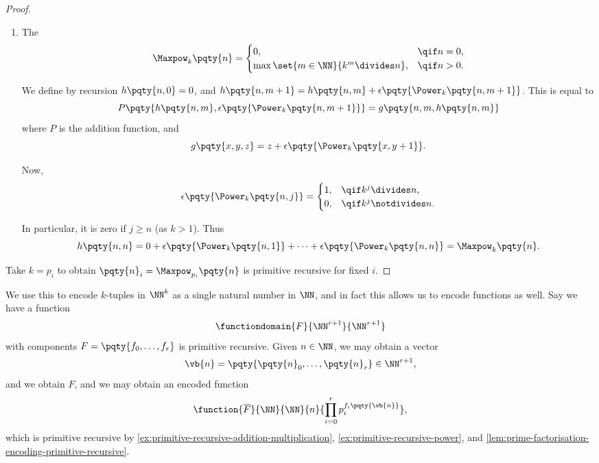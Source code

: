 \begin{proof}
\begin{enumerate}[resume]
        Notice
        \[
            \Power_k \pqty{n, 0} = n \qand \Power_k \pqty{n, m + 1} = \Divide_k \pqty{\Power_k \pqty{n, m}}.
        \]

        \item The 
        \[
            \Maxpow_k \pqty{n} = \begin{cases}
                0, &\qif n = 0, \\
                \max\set{m \in \NN}{k^m \divides n}, &\qif n > 0.
            \end{cases}
        \]

        We define by recursion \(h\pqty{n, 0} = 0\), and \(h\pqty{n, m + 1} = h \pqty{n, m} + \epsilon\pqty{\Power_k \pqty{n, m + 1}}\). This is equal to
        \[
            P\pqty{h\pqty{n, m}, \epsilon \pqty{\Power_k \pqty{n, m + 1}}} = g\pqty{n, m, h\pqty{n, m}}
        \]
        where \(P\) is the addition function, and
        \[
            g\pqty{x, y, z} = z + \epsilon \pqty{\Power_k \pqty{x, y + 1}}.
        \]

        Now,
        \[
            \epsilon\pqty{\Power_k \pqty{n, j}} = \begin{cases}
                1, & \qif k^j \divides n, \\
                0, & \qif k^j \notdivides n.
            \end{cases}
        \]

        In particular, it is zero if \(j \geq n\) (as \(k > 1\)). Thus
        \[
            h\pqty{n, n} = 0 + \epsilon\pqty{\Power_k \pqty{n, 1}} + \cdots + \epsilon\pqty{\Power_k \pqty{n, n}} = \Maxpow_k\pqty{n}.
        \]
    \end{enumerate}

    Take \(k = p_i\) to obtain \(\pqty{n}_i = \Maxpow_{p_i}\pqty{n}\) is primitive recursive for fixed \(i\).
\end{proof}

We use this to encode \(k\)-tuples in \(\NN^k\) as a single natural number in \(\NN\), and in fact this allows us to encode functions as well. Say we have a function
\[
    \functiondomain{F}{\NN^{r + 1}}{\NN^{r + 1}}
\]
with components \(F = \pqty{f_0, \ldots, f_r}\) is primitive recursive. Given \(n \in \NN\), we may obtain a vector
\[
    \vb{n} = \pqty{\pqty{n}_0, \ldots, \pqty{n}_r} \in \NN^{r + 1},
\]
and we obtain \(F\), and we may obtain an encoded function
\[
    \function{\overline{F}}{\NN}{\NN}{n}{\prod_{i = 0}^{r} p_i^{f_i\pqty{\vb{n}}}},
\]
which is primitive recursive by \autoref{ex:primitive-recursive-addition-multiplication}, \autoref{ex:primitive-recursive-power}, and \autoref{lem:prime-factorisation-encoding-primitive-recursive}.

